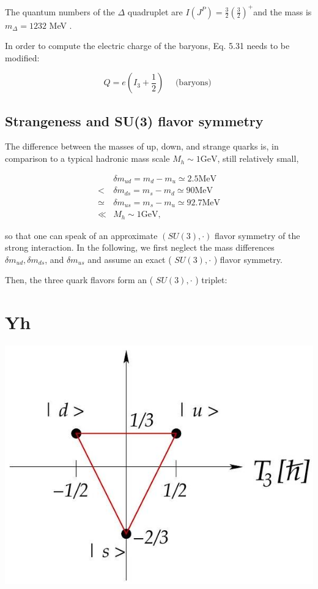 \documentclass[10pt, letterpaper]{article}
\begin{document}
The quantum numbers of the $\Delta$ quadruplet are $I\left(J^{P}\right)=\frac{3}{2}\left(\frac{3}{2}\right)^{+}$and the mass is $m_{\Delta}=1232$ MeV .

In order to compute the electric charge of the baryons, Eq. 5.31 needs to be modified:

$$
Q=e\left(I_{3}+\frac{1}{2}\right) \quad \text { (baryons) }
$$

\subsection{Strangeness and SU(3) flavor symmetry}
The difference between the masses of up, down, and strange quarks is, in comparison to a typical hadronic mass scale $M_{h} \sim 1 \mathrm{GeV}$, still relatively small,

$$
\begin{aligned}
& \delta m_{u d}=m_{d}-m_{u} \simeq 2.5 \mathrm{MeV} \\
< & \delta m_{d s}=m_{s}-m_{d} \simeq 90 \mathrm{MeV} \\
\simeq & \delta m_{u s}=m_{s}-m_{u} \simeq 92.7 \mathrm{MeV} \\
\ll & M_{h} \sim 1 \mathrm{GeV},
\end{aligned}
$$

so that one can speak of an approximate $(S U(3), \cdot)$ flavor symmetry of the strong interaction. In the following, we first neglect the mass differences $\delta m_{u d}, \delta m_{d s}$, and $\delta m_{u s}$ and assume an exact ( $S U(3), \cdot$ ) flavor symmetry.

Then, the three quark flavors form an ( $S U(3), \cdot$ ) triplet:

\section{Yh}
\begin{center}
\includegraphics[scale=0.3]{2025_05_20_8618f55a41bfe980b4b2g-67}
\end{center}
\end{document}
